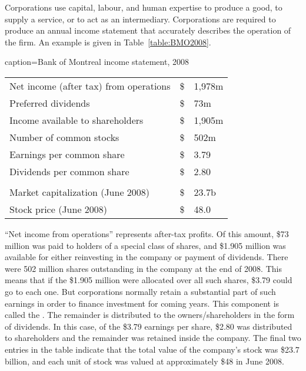 Corporations use capital, labour, and human expertise to produce a good, to
supply a service, or to act as an intermediary. Corporations are required to
produce an annual income statement that accurately describes the operation
of the firm. An example is given in Table~\ref{table:BMO2008}.

\begin{Table}{caption={Bank of Montreal income statement, 2008 \label{table:BMO2008}}}
\begin{tabu} to 30em {|X[5,l]X[0.25,c]X[1,r]|} \hline 
		Net income (after tax) from operations	&	\$	&	1,978m 		\\
	Preferred dividends						&	\$	&	73m 			\\
		Income available to shareholders		&	\$	&	1,905m 		\\
	Number of common stocks					&	\$	&	502m 			\\
		Earnings per common share				&	\$	&	3.79 			\\
	Dividends per common share				&	\$	&	2.80 			\\
												&		&					\\
	Market capitalization  (June 2008)		&	\$	&	23.7b			\\
		Stock price  (June 2008)				&	\$	&	48.0    		\\ \hline 
\end{tabu}
\end{Table}

\newhtmlpage

``Net income from operations'' represents
after-tax profits. Of this amount, \$73 million was paid to holders of a
special class of shares, and \$1.905 million was available for either
reinvesting in the company or payment of dividends. There were 502 million
shares outstanding in the company at the end of 2008. This means that if the
\$1.905 million were allocated over all such shares, \$3.79 could go to each
one. But corporations normally retain a substantial part of such earnings in
order to finance investment for coming years. This component is called the %
. The remainder is distributed to the
owners/shareholders in the form of dividends. In this case, of the \$3.79
earnings per share, \$2.80 was distributed to shareholders and the remainder
was retained inside the company. The final two entries in the table indicate
that the total value of the company's stock was \$23.7 billion, and each
unit of stock was valued at approximately \$48 in June 2008.

